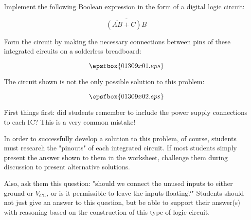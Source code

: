

Implement the following Boolean expression in the form of a digital logic circuit:

$$\overline{(\overline{AB} + C)B}$$

Form the circuit by making the necessary connections between pins of these integrated circuits on a solderless breadboard:

$$\epsfbox{01309x01.eps}$$







The circuit shown is not the only possible solution to this problem:

$$\epsfbox{01309x02.eps}$$







First things first: did students remember to include the power supply connections to each IC?  This is a very common mistake!

In order to successfully develop a solution to this problem, of course, students must research the "pinouts" of each integrated circuit.  If most students simply present the answer shown to them in the worksheet, challenge them during discussion to present alternative solutions.

Also, ask them this question: "should we connect the unused inputs to either ground or $V_{CC}$, or is it permissible to leave the inputs floating?"  Students should not just give an answer to this question, but be able to support their answer(s) with reasoning based on the construction of this type of logic circuit.




